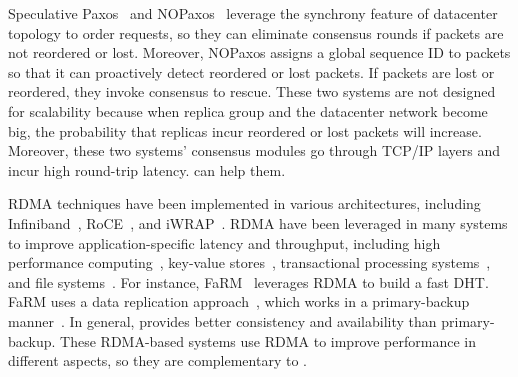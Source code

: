 Speculative Paxos~\cite{specpaxos:nsdi15} and NOPaxos~\cite{nopaxos:osdi16} 
leverage the synchrony feature of datacenter topology to order requests, so 
they can eliminate consensus rounds if packets are not reordered or lost. 
Moreover, NOPaxos assigns a global sequence ID to packets so that it can 
proactively detect reordered or lost packets. If packets are lost or 
reordered, they invoke consensus to rescue. These two systems are not designed 
for scalability because when replica group and the datacenter network 
become big, the probability that replicas incur reordered or lost packets will 
increase. Moreover, these two systems' consensus modules go through TCP/IP 
layers and incur high round-trip latency. \xxx can help them.

 RDMA techniques have been implemented in various 
architectures, including Infiniband~\cite{infiniband}, RoCE~\cite{roce}, and 
iWRAP~\cite{iwrap}. RDMA have been leveraged in many systems to improve 
application-specific latency and throughput, including high performance 
computing~\cite{openmpi}, key-value 
stores~\cite{pilaf:usenix14,herd:sigcomm14,farm:nsdi14,memcached:rdma}, 
transactional processing systems~\cite{drtm:sosp15,farm:sosp15}, and file 
systems~\cite{gibson:nfs}. For instance, FaRM~\cite{farm:nsdi14} leverages RDMA 
to build a fast DHT. FaRM uses a data replication 
approach~\cite{ramcloud:sosp11}, which works in a primary-backup 
manner~\cite{remus:nsdi08}. In general, \paxos provides better consistency and 
availability than primary-backup. These RDMA-based systems use RDMA to improve 
performance in different aspects, so they are complementary to \xxx.




